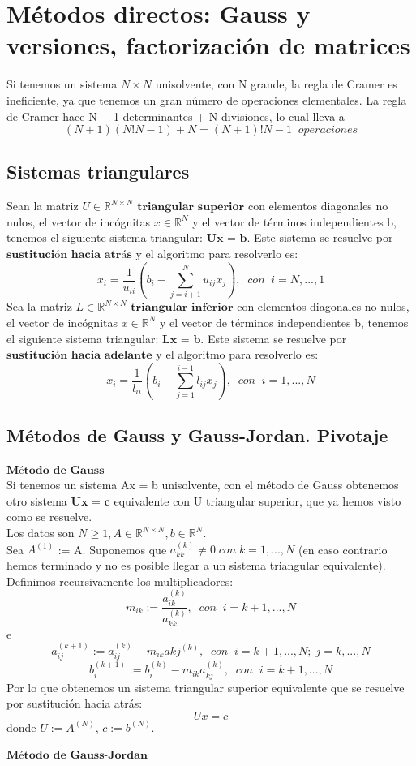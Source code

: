 	\section{Métodos directos: Gauss y versiones, factorización de matrices}
	Si tenemos un sistema $N \times N$ unisolvente, con N grande, la regla de Cramer es ineficiente, ya que tenemos un gran número de operaciones elementales. La regla de Cramer hace N + 1 determinantes + N divisiones, lo cual lleva a
\[ (N+1)(N!N-1)+N = (N+1)!N-1 \; \; operaciones \]
		\subsection{Sistemas triangulares}
		Sean la matriz $U \in \mathbb{R}^{N \times N}$ $\textbf{triangular superior}$ con elementos diagonales no nulos, el vector de incógnitas $x \in \mathbb{R}^N$ y el vector de términos independientes b, tenemos el siguiente sistema triangular: $\textbf{Ux = b}$. Este sistema se resuelve por $\textbf{sustitución hacia atrás}$ y el algoritmo para resolverlo es:
		\[ x_i = \frac{1}{u_{ii}} \left( b_i - \sum _{j=i+1}^N u_{ij}x_j \right), \; \; con \; \; i = N,...,1 \]
		Sea la matriz $L \in \mathbb{R}^{N \times N}$  $\textbf{triangular inferior}$ con elementos diagonales no nulos, el vector de incógnitas $x \in \mathbb{R}^N$ y el vector de términos independientes b, tenemos el siguiente sistema triangular: $\textbf{Lx = b}$. Este sistema se resuelve por $\textbf{sustitución hacia adelante}$ y el algoritmo para resolverlo es:
		\[ x_i = \frac{1}{l_{ii}} \left( b_i - \sum _{j=1}^{i-1} l_{ij}x_j \right), \; \; con \; \; i = 1,...,N \]
		
		\subsection{Métodos de Gauss y Gauss-Jordan. Pivotaje}
		\begin{nlist}
		\item $\textbf{Método de Gauss}$\\
		Si tenemos un sistema Ax = b unisolvente, con el método de Gauss obtenemos otro sistema $\textbf{Ux = c}$ equivalente con U triangular superior, que ya hemos visto como se resuelve.\\
		Los datos son $N \geq 1, A \in \mathbb{R}^{N \times N}, b \in \mathbb{R}^N$.\\
		Sea $A^{(1)}$ := A. Suponemos que $a_{kk}^{(k)} \neq 0 \; con \; k = 1,...,N$ (en caso contrario hemos terminado y no es posible llegar a un sistema triangular equivalente). Definimos recursivamente los multiplicadores:
		\[ m_{ik} := \frac{a_{ik}^{(k)}}{a_{kk}^{(k)}}, \; \; con \; \; i = k+1,...,N \]
e
\[ a_{ij}^{(k+1)} := a_{ij}^{(k)} - m_{ik}a{kj}^{(k)}, \; \; con \; \; i = k+1,...,N; \; j = k,...,N \]
\[ b_i^{(k+1)} := b_i^{(k)} - m_{ik}a_{kj}^{(k)}, \; \; con \; \; i = k+1,...,N \]
Por lo que obtenemos un sistema triangular superior equivalente que se resuelve por sustitución hacia atrás:
\[ Ux = c \]
donde $U := A^{(N)}$, $c := b^{(N)}$.
		
		\item $\textbf{Método de Gauss-Jordan}$
		
		
		\end{nlist}
		
